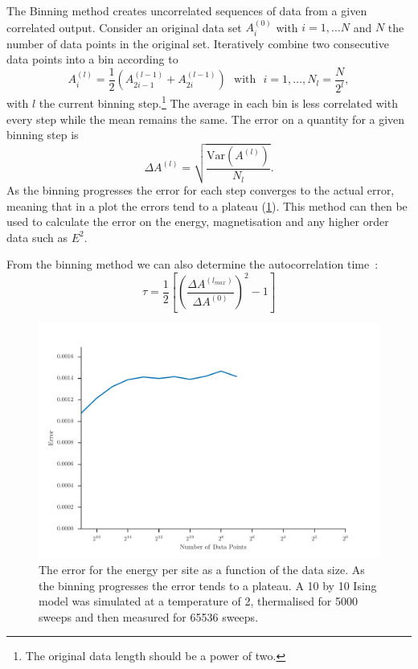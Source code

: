 \documentclass[11pt, a4paper]{report} %
\begin{document}
The Binning method creates uncorrelated sequences of data from a given correlated output.
Consider an original data set \(A_i^{(0)}\) with \(i = 1, \ldots N\) and \(N\) the number of data points in the original set.
Iteratively combine two consecutive data points into a bin according to
\begin{equation}
	A_i^{(l)} = \frac{1}{2} \left(A_{2i-1}^{(l-1)} + A_{2i}^{(l-1)} \right) \mathrm{\ \ \ with \ \ \ } i = 1, \ldots, N_l = \frac{N}{2^l},
\end{equation}
with \(l\) the current binning step.\footnote{The original data length should be a power of two.}
The average in each bin is less correlated with every step while the mean remains the same.
The error on a quantity for a given binning step is
\begin{equation}
	\label{eq:basic_error}
	\Delta A^{(l)} = \sqrt{\frac{\mathrm{Var}(A^{(l)})}{N_l}}.
\end{equation}
As the binning progresses the error for each step converges to the actual error, meaning that in a plot the errors tend to a plateau (\cref{fig:binning_error_convergence}).
This method can then be used to calculate the error on the energy, magnetisation and any higher order data such as \(E^2\).

From the binning method we can also determine the autocorrelation time~\cite{corboz}:
\begin{equation}
	\tau = \frac{1}{2} \left[\left( \frac{\Delta A^{(l_{max})}}{\Delta A^{(0)}} \right)^2- 1 \right]
\end{equation}
\begin{figure}[htb]
	\centering
	\includegraphics[width=\linewidth]{ising_metropolis_energy_per_site_error_binning.pdf}
	\caption{The error for the energy per site as a function of the data size. As the binning progresses the error tends to a plateau. A 10 by 10 Ising model was simulated at a temperature of 2, thermalised for 5000 sweeps and then measured for 65536 sweeps.}
	\label{fig:binning_error_convergence}
\end{figure}
\end{document}
